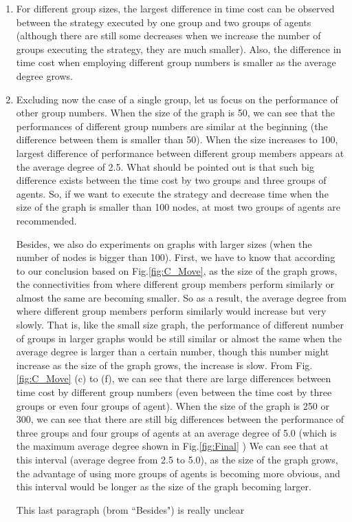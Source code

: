 \begin{enumerate}
\item For different group sizes, the largest difference in time cost can be observed between the strategy executed by one group and two groups of agents  (although there are still some decreases when we increase the number of groups executing the strategy, they are much smaller). Also, the difference in time cost when employing different group numbers is smaller as the average degree grows.

\item Excluding now the case of a single group, let us focus on the performance of other group numbers. When the size of the graph is 50, we can see that the performances of different group numbers are similar at the beginning (the difference between them is smaller than 50). When the size increases to 100, largest difference of performance between different group members appears at the average degree of 2.5. What should be pointed out is that such big difference exists between the time cost by two groups and three groups of agents. So, if we want to execute the strategy and decrease time when the size of the graph is smaller than 100 nodes, at most two groups of agents are recommended.

Besides, we also do experiments on graphs with larger sizes (when the number of nodes is bigger than 100). First, we have to know that according to our conclusion based on Fig.\ref{fig:C_Move}, as the size of the graph grows, the connectivities from where different group members perform similarly or almost the same are becoming smaller. So as a result, the average degree from where different group members perform similarly would increase but very slowly. That is, like the small size graph, the performance of different number of groups in larger graphs would be still similar or almost the same when the average degree is larger than a certain number, though this number might increase as the size of the graph grows, the increase is slow. From Fig.\ref{fig:C_Move} (c) to (f), we can see that there are large differences between time cost by different group numbers (even between the time cost by three groups or even four groups of agent). When the size of the graph is 250 or 300, we can see that there are still  big differences between the performance of three groups and four groups of agents at an average degree of 5.0 (which is the maximum average degree shown in Fig.\ref{fig:Final} )
We can see that at this interval (average degree from 2.5 to 5.0), as the size of the graph grows, the advantage of using more groups of agents is becoming more obvious, and this interval would be longer as the size of the graph becoming larger.


  \color{blue} This last paragraph (brom ``Besides")  is really unclear \color{black}
\end{enumerate}



